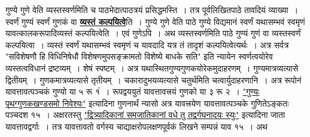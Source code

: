 \documentclass[11pt, openany]{book}
\begin{document}
\begin{sloppypar}
गुण्ये गुणे वेति व्यस्तस्वर्णमिति च पाठभेदात्पाठत्रयं प्रसिद्धमस्ति~। तत्र पूर्वलिखितपाठे तावदियं व्याख्या~। स्वर्णं गुण्यं स्वर्णं गुणकं वा \hyperref[3.28]{\textbf{व्यस्तं कल्पयित्वे}}ति~। गुण्ये गुणे वेति पाठे गुण्ये विद्यमानं स्वर्णं यथासम्भवं स्वमृणं यावत्कालकरूपादिव्यस्तं कल्पयित्वेति~। एवं गुणेऽपि~। अथ व्यस्तस्वर्णमिति पाठे गुण्यं गुणं वा व्यस्तस्वर्णं कल्पयित्वा~।  व्यस्तं स्वर्णं यथासम्भवं स्वमृणं च यावदादि यत्र तं तादृशं कल्पयित्वेत्यर्थः~। अत्र सर्वत्र {\color{violet}"सविशेषणौ हि विधिनिषेधौ विशेषणमुपसङ्क्रामतो विशेष्ये बाधके सति"} इति न्यायेन स्वर्णत्वयोरेव व्यस्तत्वविधानं द्रष्टव्यम्~। शेषं स्पष्टम्~। अत्र यथास्थितगुण्यगुणकयोरेकमुदाहरणम्~। गुण्यमात्रव्यत्यासे द्वितीयम्~। गुणकमात्रव्यत्यासे तृतीयम्~। चकारादुभयव्यत्यासे चतुर्थमिति चत्वार्युदाहरणानि~। अत्र रूपोनं यावत्तावत्पञ्चकं गुण्यो या ५ रू १ं~। रूपद्वययुतं यावत्तावत्त्रयं गुणको या ३ रू २~। \hyperref[3.27.1]{"गुण्यः पृथग्गुणकखण्डसमो निवेश्यः"} इत्यादिना गुणनार्थं न्यासो  \;अत्र यावत्त्रयेण यावत्तावत्पञ्चके गुणितेऽङ्कतः पञ्चदश १५~। अक्षरतस्तु \hyperref[3.26]{"द्वित्र्यादिकानां समजातिकानां वधे तु तद्वर्गघनादयः स्युः"} इत्यादिना जाता यावत्तावद्वर्गाः~। तत्र यावत्तावतो वर्गस्य चाद्याक्षरोपलक्षणपूर्वकं लिखने सम्पन्नं याव १५~। अथ
\end{sloppypar}

\newpage
\end{document}

